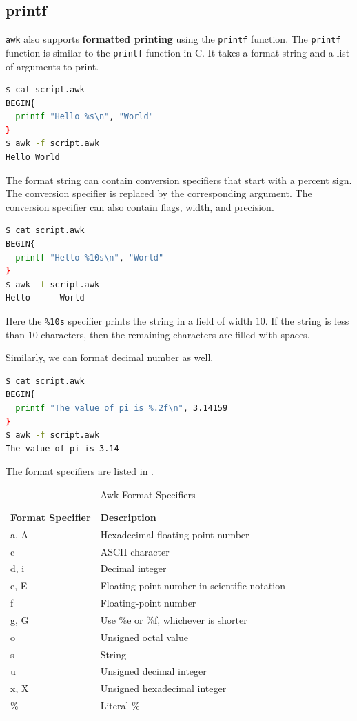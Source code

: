 \subsection{printf}

\lstinline|awk| also supports \textbf{formatted printing} using the \lstinline|printf| function.
The \lstinline|printf| function is similar to the \lstinline|printf| function in C.
It takes a format string and a list of arguments to print.

\begin{lstlisting}[language=bash]
$ cat script.awk
BEGIN{
  printf "Hello %s\n", "World"
}
$ awk -f script.awk
Hello World
\end{lstlisting}

The format string can contain conversion specifiers that start with a percent sign.
The conversion specifier is replaced by the corresponding argument.
The conversion specifier can also contain flags, width, and precision.

\begin{lstlisting}[language=bash]
$ cat script.awk
BEGIN{
  printf "Hello %10s\n", "World"
}
$ awk -f script.awk
Hello      World
\end{lstlisting}

Here the \lstinline|%10s| specifier prints the string in a field of width $10$.
If the string is less than $10$ characters, then the remaining characters are filled with spaces.

Similarly, we can format decimal number as well.

\begin{lstlisting}[language=bash]
$ cat script.awk
BEGIN{
  printf "The value of pi is %.2f\n", 3.14159
}
$ awk -f script.awk
The value of pi is 3.14
\end{lstlisting}

The format specifiers are listed in .
\begin{table}[h!]
    \centering
    \begin{tabular}{l l}
        \textbf{Format Specifier} & \textbf{Description} \\
        a, A & Hexadecimal floating-point number \\
        c & ASCII character \\
        d, i & Decimal integer \\
        e, E & Floating-point number in scientific notation \\
        f & Floating-point number \\
        g, G & Use \%e or \%f, whichever is shorter \\
        o & Unsigned octal value \\
        s & String \\
        u & Unsigned decimal integer \\
        x, X & Unsigned hexadecimal integer \\
        \% & Literal \% \\
    \end{tabular}
    \caption{Awk Format Specifiers}
\end{table}

